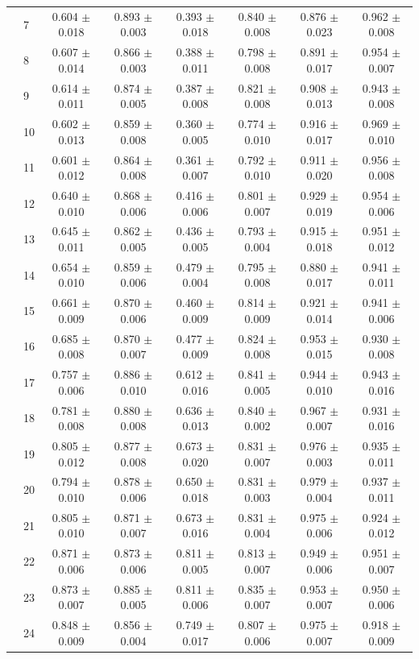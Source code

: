 \begin{longtable}{llcccccc}
 & 7 & 0.604 $\pm$ 0.018 & 0.893 $\pm$ 0.003 & 0.393 $\pm$ 0.018 & 0.840 $\pm$ 0.008 & 0.876 $\pm$ 0.023 & 0.962 $\pm$ 0.008 \\
 & 8 & 0.607 $\pm$ 0.014 & 0.866 $\pm$ 0.003 & 0.388 $\pm$ 0.011 & 0.798 $\pm$ 0.008 & 0.891 $\pm$ 0.017 & 0.954 $\pm$ 0.007 \\
 & 9 & 0.614 $\pm$ 0.011 & 0.874 $\pm$ 0.005 & 0.387 $\pm$ 0.008 & 0.821 $\pm$ 0.008 & 0.908 $\pm$ 0.013 & 0.943 $\pm$ 0.008 \\
 & 10 & 0.602 $\pm$ 0.013 & 0.859 $\pm$ 0.008 & 0.360 $\pm$ 0.005 & 0.774 $\pm$ 0.010 & 0.916 $\pm$ 0.017 & 0.969 $\pm$ 0.010 \\
 & 11 & 0.601 $\pm$ 0.012 & 0.864 $\pm$ 0.008 & 0.361 $\pm$ 0.007 & 0.792 $\pm$ 0.010 & 0.911 $\pm$ 0.020 & 0.956 $\pm$ 0.008 \\
 & 12 & 0.640 $\pm$ 0.010 & 0.868 $\pm$ 0.006 & 0.416 $\pm$ 0.006 & 0.801 $\pm$ 0.007 & 0.929 $\pm$ 0.019 & 0.954 $\pm$ 0.006 \\
 & 13 & 0.645 $\pm$ 0.011 & 0.862 $\pm$ 0.005 & 0.436 $\pm$ 0.005 & 0.793 $\pm$ 0.004 & 0.915 $\pm$ 0.018 & 0.951 $\pm$ 0.012 \\
 & 14 & 0.654 $\pm$ 0.010 & 0.859 $\pm$ 0.006 & 0.479 $\pm$ 0.004 & 0.795 $\pm$ 0.008 & 0.880 $\pm$ 0.017 & 0.941 $\pm$ 0.011 \\
 & 15 & 0.661 $\pm$ 0.009 & 0.870 $\pm$ 0.006 & 0.460 $\pm$ 0.009 & 0.814 $\pm$ 0.009 & 0.921 $\pm$ 0.014 & 0.941 $\pm$ 0.006 \\
 & 16 & 0.685 $\pm$ 0.008 & 0.870 $\pm$ 0.007 & 0.477 $\pm$ 0.009 & 0.824 $\pm$ 0.008 & 0.953 $\pm$ 0.015 & 0.930 $\pm$ 0.008 \\
 & 17 & 0.757 $\pm$ 0.006 & 0.886 $\pm$ 0.010 & 0.612 $\pm$ 0.016 & 0.841 $\pm$ 0.005 & 0.944 $\pm$ 0.010 & 0.943 $\pm$ 0.016 \\
 & 18 & 0.781 $\pm$ 0.008 & 0.880 $\pm$ 0.008 & 0.636 $\pm$ 0.013 & 0.840 $\pm$ 0.002 & 0.967 $\pm$ 0.007 & 0.931 $\pm$ 0.016 \\
 & 19 & 0.805 $\pm$ 0.012 & 0.877 $\pm$ 0.008 & 0.673 $\pm$ 0.020 & 0.831 $\pm$ 0.007 & 0.976 $\pm$ 0.003 & 0.935 $\pm$ 0.011 \\
 & 20 & 0.794 $\pm$ 0.010 & 0.878 $\pm$ 0.006 & 0.650 $\pm$ 0.018 & 0.831 $\pm$ 0.003 & 0.979 $\pm$ 0.004 & 0.937 $\pm$ 0.011 \\
 & 21 & 0.805 $\pm$ 0.010 & 0.871 $\pm$ 0.007 & 0.673 $\pm$ 0.016 & 0.831 $\pm$ 0.004 & 0.975 $\pm$ 0.006 & 0.924 $\pm$ 0.012 \\
 & 22 & 0.871 $\pm$ 0.006 & 0.873 $\pm$ 0.006 & 0.811 $\pm$ 0.005 & 0.813 $\pm$ 0.007 & 0.949 $\pm$ 0.006 & 0.951 $\pm$ 0.007 \\
 & 23 & 0.873 $\pm$ 0.007 & 0.885 $\pm$ 0.005 & 0.811 $\pm$ 0.006 & 0.835 $\pm$ 0.007 & 0.953 $\pm$ 0.007 & 0.950 $\pm$ 0.006 \\
 & 24 & 0.848 $\pm$ 0.009 & 0.856 $\pm$ 0.004 & 0.749 $\pm$ 0.017 & 0.807 $\pm$ 0.006 & 0.975 $\pm$ 0.007 & 0.918 $\pm$ 0.009 \\
\end{longtable}
\endgroup
